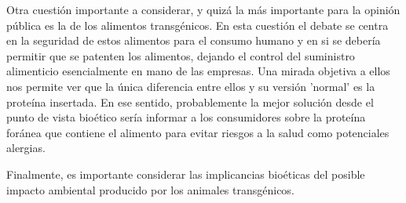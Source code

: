 \documentclass[fleqn,10pt]{SelfArx} %
\begin{document}
Otra cuestión importante a considerar, y quizá la más importante para la opinión pública es la de los alimentos transgénicos. En esta cuestión el debate se centra en la seguridad de estos alimentos para el consumo humano y en si se debería permitir que se patenten los alimentos, dejando el control del suministro alimenticio esencialmente en mano de las empresas. Una mirada objetiva a ellos nos permite ver que la única diferencia entre ellos y su versión 'normal' es la proteína insertada. En ese sentido, probablemente la mejor solución desde el punto de vista bioético sería informar a los consumidores sobre la proteína foránea que contiene el alimento para evitar riesgos a la salud como potenciales alergias\cite{berkowitz1994transgenic, Jefferson, ledford2013transgenic}. 

Finalmente, es importante considerar las implicancias bioéticas del posible impacto ambiental producido por los animales transgénicos. 







\end{document}
